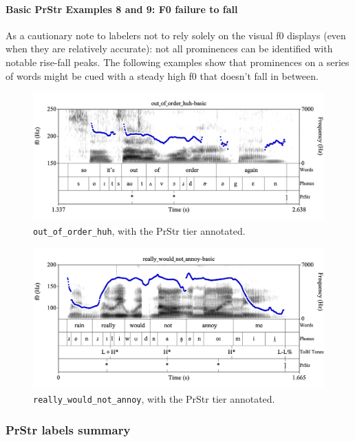 \documentclass[11pt, twoside]{memoir}
\begin{document}
\paragraph{Basic PrStr Examples 8 and 9: F0 failure to fall}
As a cautionary note to labelers not to rely solely on the visual f0 displays (even when they are relatively accurate): not all prominences can be identified with notable rise-fall peaks. The following examples show that prominences on a series of words might be cued with a steady high f0 that doesn’t fall in between. 

\begin{figure}[H]
\centering
%
\includegraphics[width=.875\linewidth]{PrStr-out_of_order_huh-basic.png}
%
\caption{\texttt{out\_of\_order\_huh}, with the PrStr tier annotated.%
\label{fig:out_of_order_huh PrStr}%
%
}
\end{figure}

\begin{figure}[H]
\centering
%
\includegraphics[width=.875\linewidth]{PrStr-really_would_not_annoy-basic.png}
%
\caption{\texttt{really\_would\_not\_annoy}, with the PrStr tier annotated.%
\label{fig:really_would_not_annoy PrStr}%
%
}
\end{figure}


\subsubsection{PrStr labels summary}\label{sec:prstr-labels-summary}
\end{document}
